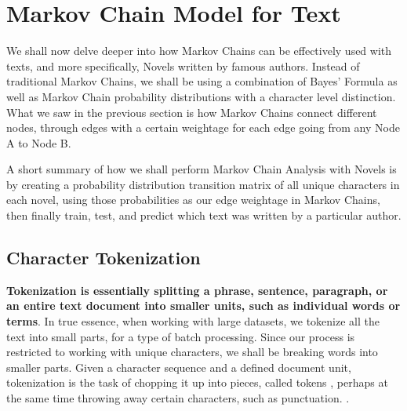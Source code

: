 

\chapter{Markov Chain Model for Text} %
\label{cha:markov_chain_text} %

We shall now delve deeper into how Markov Chains can be effectively used with texts, and more specifically, Novels written by famous authors. Instead of traditional Markov Chains, we shall be using a combination of Bayes' Formula as well as Markov Chain probability distributions with a character level distinction. What we saw in the previous section is how Markov Chains connect different nodes, through edges with a certain weightage for each edge going from any Node A to Node B.

A short summary of how we shall perform Markov Chain Analysis with Novels is by creating a probability distribution transition matrix of all unique characters in each novel, using those probabilities as our edge weightage in Markov Chains, then finally train, test, and predict which text was written by a particular author.

\section{Character Tokenization} %
\label{sec:tokenization} %

\textbf{Tokenization is essentially splitting a phrase, sentence, paragraph, or an entire text document into smaller units, such as individual words or terms}. In true essence, when working with large datasets, we tokenize all the text into small parts, for a type of batch processing. Since our process is restricted to working with unique characters, we shall be breaking words into smaller parts. Given a character sequence and a defined document unit, tokenization is the task of chopping it up into pieces, called tokens , perhaps at the same time throwing away certain characters, such as punctuation. \textcite{manning:2008}.

